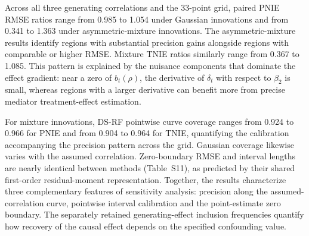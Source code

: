 Across all three generating correlations and the 33-point grid, paired PNIE RMSE ratios range from 0.985 to 1.054 under Gaussian innovations and from 0.341 to 1.363 under asymmetric-mixture innovations. The asymmetric-mixture results identify regions with substantial precision gains alongside regions with comparable or higher RMSE. Mixture TNIE ratios similarly range from 0.367 to 1.085. This pattern is explained by the nuisance components that dominate the effect gradient: near a zero of $b_t(\rho)$, the derivative of $\delta_t$ with respect to $\beta_2$ is small, whereas regions with a larger derivative can benefit more from precise mediator treatment-effect estimation.

For mixture innovations, DS-RF pointwise curve coverage ranges from 0.924 to 0.966 for PNIE and from 0.904 to 0.964 for TNIE, quantifying the calibration accompanying the precision pattern across the grid. Gaussian coverage likewise varies with the assumed correlation. Zero-boundary RMSE and interval lengths are nearly identical between methods (Table~S11), as predicted by their shared first-order residual-moment representation. Together, the results characterize three complementary features of sensitivity analysis: precision along the assumed-correlation curve, pointwise interval calibration and the point-estimate zero boundary. The separately retained generating-effect inclusion frequencies quantify how recovery of the causal effect depends on the specified confounding value.
